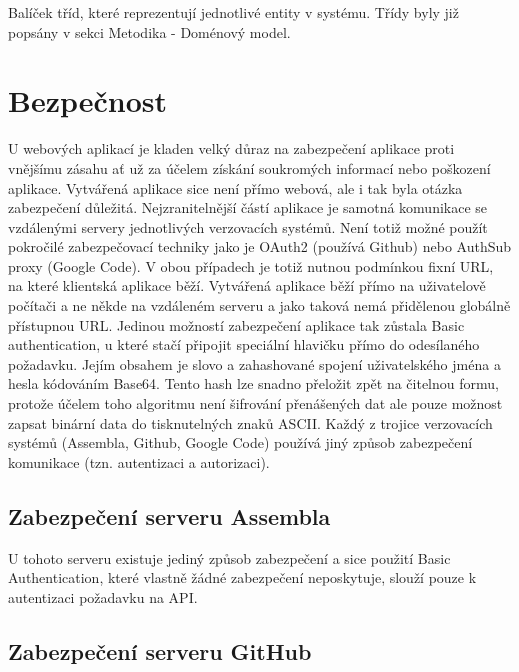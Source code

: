Balíček tříd, které reprezentují jednotlivé entity v systému. Třídy byly již popsány v sekci Metodika - Doménový model.

\section{Bezpečnost}

U webových aplikací je kladen velký důraz na zabezpečení aplikace proti vnějšímu zásahu ať už za účelem získání soukromých informací nebo poškození aplikace. Vytvářená aplikace sice není přímo webová, ale i tak byla otázka zabezpečení důležitá. Nejzranitelnější částí aplikace je samotná komunikace se vzdálenými servery jednotlivých verzovacích systémů. Není totiž možné použít pokročilé zabezpečovací techniky jako je OAuth2 (používá Github) nebo AuthSub proxy (Google Code). V obou případech je totiž nutnou podmínkou fixní URL, na které klientská aplikace běží. Vytvářená aplikace běží přímo na uživatelově počítači a ne někde na vzdáleném serveru a jako taková nemá přidělenou globálně přístupnou URL. Jedinou možností zabezpečení aplikace tak zůstala Basic authentication, u které stačí připojit speciální hlavičku  přímo do odesílaného požadavku. Jejím obsahem je slovo  a zahashované spojení uživatelského jména a hesla kódováním Base64. Tento hash lze snadno přeložit zpět na čitelnou formu, protože účelem toho algoritmu není šifrování přenášených dat ale pouze možnost zapsat binární data do tisknutelných znaků ASCII. Každý z trojice verzovacích systémů (Assembla, Github, Google Code) používá jiný způsob zabezpečení komunikace (tzn. autentizaci a autorizaci). 

\subsection{Zabezpečení serveru Assembla}

U tohoto serveru existuje jediný způsob zabezpečení\cite{assemblaauth} a sice použití Basic Authentication, které vlastně žádné zabezpečení neposkytuje, slouží pouze k autentizaci požadavku na API.

\subsection{Zabezpečení serveru GitHub}

